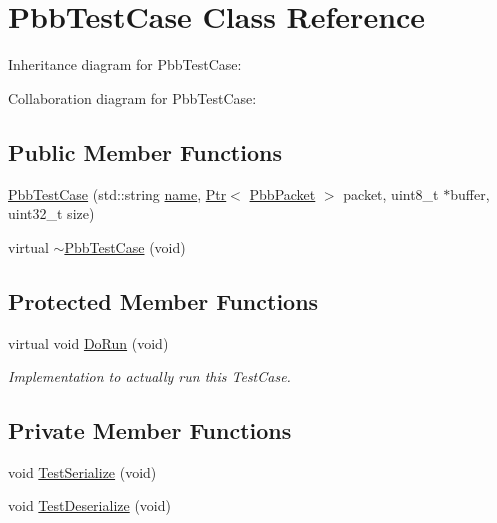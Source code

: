 \hypertarget{classPbbTestCase}{}\section{Pbb\+Test\+Case Class Reference}
\label{classPbbTestCase}


Inheritance diagram for Pbb\+Test\+Case\+:


Collaboration diagram for Pbb\+Test\+Case\+:
\subsection*{Public Member Functions}
\begin{DoxyCompactItemize}
\item 
\hyperlink{classPbbTestCase_aad11415643c1af39d71248174298dd6b}{Pbb\+Test\+Case} (std\+::string \hyperlink{generate__test__data__lte__spectrum__model_8m_ab74e6bf80237ddc4109968cedc58c151}{name}, \hyperlink{classns3_1_1Ptr}{Ptr}$<$ \hyperlink{classns3_1_1PbbPacket}{Pbb\+Packet} $>$ packet, uint8\+\_\+t $\ast$buffer, uint32\+\_\+t size)
\item 
virtual \hyperlink{classPbbTestCase_a23c25fa1197ee615d7ccef9e8e813762}{$\sim$\+Pbb\+Test\+Case} (void)
\end{DoxyCompactItemize}
\subsection*{Protected Member Functions}
\begin{DoxyCompactItemize}
\item 
virtual void \hyperlink{classPbbTestCase_a7e27e798743b0fee57106bdc3ff63a1c}{Do\+Run} (void)
\begin{DoxyCompactList}\small\item\em Implementation to actually run this Test\+Case. \end{DoxyCompactList}\end{DoxyCompactItemize}
\subsection*{Private Member Functions}
\begin{DoxyCompactItemize}
\item 
void \hyperlink{classPbbTestCase_af46a68e3ac1ac6a3acba3db64974cba8}{Test\+Serialize} (void)
\item 
void \hyperlink{classPbbTestCase_a94ee7e29255773f0ea94597fd0af89ff}{Test\+Deserialize} (void)
\end{DoxyCompactItemize}
